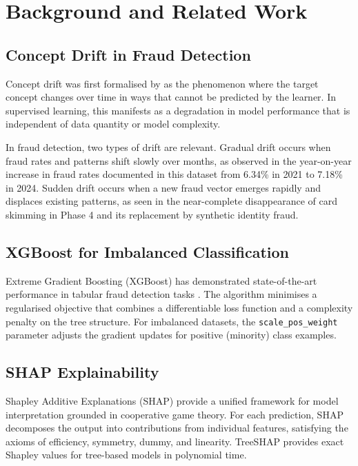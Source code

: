 \documentclass[12pt, a4paper]{article}
\begin{document}
\section{Background and Related Work}

\subsection{Concept Drift in Fraud Detection}

Concept drift was first formalised by \cite{widmer1996} as the phenomenon where the target concept changes over time in ways that cannot be predicted by the learner. In supervised learning, this manifests as a degradation in model performance that is independent of data quantity or model complexity.

In fraud detection, two types of drift are relevant. Gradual drift occurs when fraud rates and patterns shift slowly over months, as observed in the year-on-year increase in fraud rates documented in this dataset from 6.34\% in 2021 to 7.18\% in 2024. Sudden drift occurs when a new fraud vector emerges rapidly and displaces existing patterns, as seen in the near-complete disappearance of card skimming in Phase 4 and its replacement by synthetic identity fraud.

\subsection{XGBoost for Imbalanced Classification}

Extreme Gradient Boosting (XGBoost) \cite{chen2016} has demonstrated state-of-the-art performance in tabular fraud detection tasks \cite{dal2015}. The algorithm minimises a regularised objective that combines a differentiable loss function and a complexity penalty on the tree structure. For imbalanced datasets, the \texttt{scale\_pos\_weight} parameter adjusts the gradient updates for positive (minority) class examples.

\subsection{SHAP Explainability}

Shapley Additive Explanations (SHAP) \cite{lundberg2017} provide a unified framework for model interpretation grounded in cooperative game theory. For each prediction, SHAP decomposes the output into contributions from individual features, satisfying the axioms of efficiency, symmetry, dummy, and linearity. TreeSHAP \cite{lundberg2018} provides exact Shapley values for tree-based models in polynomial time.
\end{document}
